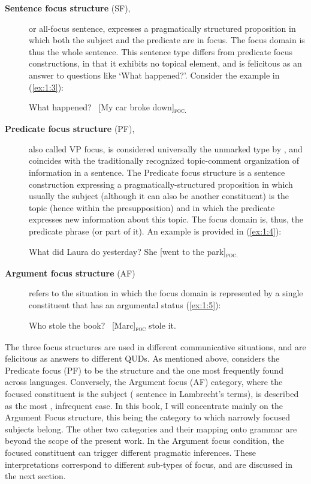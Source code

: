 \begin{description}
  \item[\textbf{Sentence focus structure} (SF),] or all-focus sentence, expresses a pragmatically structured proposition in which both the subject and the predicate are in focus. The focus domain is thus the whole sentence. This sentence type differs from predicate focus constructions, in that it exhibits no topical element, and is felicitous as an answer to questions like ‘What happened?'. Consider the example in (\ref{ex:1:3}):
    
\ea \label{ex:1:3}
\ea What happened?
\ex \ [My car broke down]\textsubscript{\textsc{foc.}} \normalsize \hfill \parencite[223]{lambrecht1996information}   
\z \z

\item[\textbf{Predicate focus structure} (PF),] also called VP focus, is considered universally the unmarked type by \textcite[622]{lambrecht2000subjects}, and coincides with the traditionally recognized topic-comment organization of information in a sentence. The Predicate focus structure is a sentence construction expressing a pragmatically-structured proposition in which usually the subject (although it can also be another constituent) is the topic (hence within the presupposition) and in which the predicate expresses new information about this topic. The focus domain is, thus, the predicate phrase (or part of it). An example is provided in (\ref{ex:1:4}):
    
    \ea \label{ex:1:4}
    \ea What did Laura do yesterday?
    \ex She [went to the park]\textsubscript{\textsc{foc.}}\normalsize
    \z \z

\item[\textbf{Argument focus structure} (AF)] refers to the situation in which the focus domain is represented by a single constituent that has an argumental status (\ref{ex:1:5}):

\ea \label{ex:1:5}
\ea Who stole the book?
\ex \ [Marc]\textsubscript{\textsc{foc}} \normalsize stole it.
\z \z

\end{description}


The three focus structures are used in different communicative situations, and are felicitous as answers to different QUDs. As mentioned above, \textcite{lambrecht2010constraints} considers the Predicate focus (PF) to be the  structure and the one most frequently found across languages. 
Conversely, the Argument focus (AF) category, where the focused constituent is the subject ( sentence in Lambrecht's terms), is described as the most , infrequent case. 
In this book, I will concentrate mainly on the Argument Focus structure, this being the category to which narrowly focused subjects belong. The other two categories and their mapping onto grammar are beyond the scope of the present work.
In the Argument focus condition, the focused constituent can trigger different pragmatic inferences. These interpretations correspond to different sub-types of focus, and are discussed in the next section.

